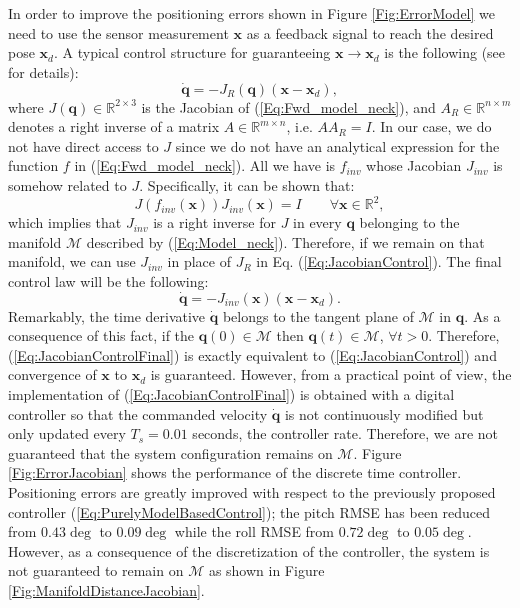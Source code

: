 \documentclass[conference]{IEEEtran}
\numberwithin{equation}{section}
\newcommand{\q}{\mathbf{q}}
\newcommand{\x}{\mathbf{x}}
\begin{document}
In order to improve the positioning errors shown in Figure \ref{Fig:ErrorModel} we need to use the sensor measurement $\x$ as a feedback signal to reach the desired pose $\x_d$. A typical control structure for guaranteeing $\x \rightarrow \x_d$ is the following (see \cite{SamsonEspiau} for details):
\begin{equation} \label{Eq:JacobianControl}
\dot{\q} = - J_R(\q) (\x - \x_d),
\end{equation}
where $J(\q) \in \mathbb R^{2 \times 3}$ is the Jacobian of (\ref{Eq:Fwd_model_neck}), and $A_R \in \mathbb R^{n \times m}$ denotes a right inverse of a matrix $A \in \mathbb R^{m \times n}$, i.e. $A A_R = I$. In our case, we do not have direct access to $J$ since we do not have an analytical expression for the function $f$ in (\ref{Eq:Fwd_model_neck}). All we have is $f_{inv}$ whose Jacobian $J_{inv}$ is somehow related to $J$. Specifically, it can be shown that:
\begin{equation} \label{Eq:JacobianInv}
J(f_{inv}(\x)) J_{inv} (\x) = I \qquad \forall \x \in \mathbb R^2,
\end{equation}
which implies that $J_{inv}$ is a right inverse for  $J$ in every $\q$ belonging to the manifold $\mathcal M$ described by (\ref{Eq:Model_neck}). Therefore, if we remain on that manifold, we can use $J_{inv}$ in place of $J_R$ in Eq. (\ref{Eq:JacobianControl}). The final control law will be the following:
\begin{equation} \label{Eq:JacobianControlFinal}
\dot{\q} = - J_{inv}(\x) (\x - \x_d).
\end{equation}
Remarkably, the time derivative $\dot{\q}$ belongs to the tangent plane of $\mathcal M$ in $\mathbf q$. As a consequence of this fact, if the $\q(0) \in \mathcal M$ then $\q(t) \in \mathcal M$, $\forall t > 0$. Therefore, (\ref{Eq:JacobianControlFinal}) is exactly equivalent to (\ref{Eq:JacobianControl}) and convergence of $\x$ to $\x_d$ is guaranteed. However, from a practical point of view, the implementation of (\ref{Eq:JacobianControlFinal}) is obtained with a digital controller so that the commanded velocity $\dot{\q}$ is not continuously modified but only updated every $T_s = 0.01$ seconds, the controller rate. Therefore, we are not guaranteed that the system configuration remains on $\mathcal{M}$. Figure \ref{Fig:ErrorJacobian} shows the performance of the discrete time controller. Positioning errors are greatly improved with respect to the previously proposed controller (\ref{Eq:PurelyModelBasedControl}); the pitch RMSE has been reduced from $0.43 \deg$ to $0.09 \deg$ while the roll RMSE from $0.72 \deg$ to $0.05 \deg$. However, as a consequence of the discretization of the controller, the system is not guaranteed to remain on $\mathcal M$ as shown in Figure \ref{Fig:ManifoldDistanceJacobian}. 
\end{document}
